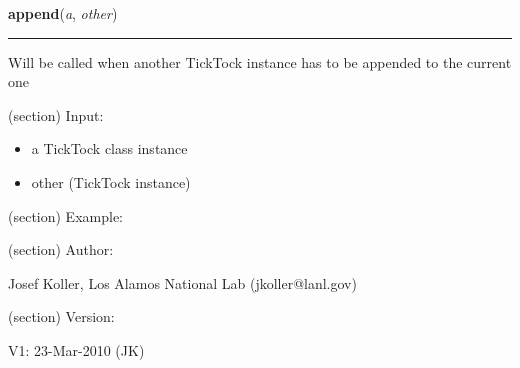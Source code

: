     \label{spacepy:spacetime:TickTock:append}

    \vspace{0.5ex}

\hspace{.8\funcindent}\begin{boxedminipage}{\funcwidth}

    \raggedright \textbf{append}(\textit{a}, \textit{other})

    \vspace{-1.5ex}

    \rule{\textwidth}{0.5\fboxrule}
\setlength{\parskip}{2ex}
    Will be called when another TickTock instance has to be appended to the
    current one

    (section) Input:

      \begin{itemize}
      \setlength{\parskip}{0.6ex}
        \item a TickTock class instance

        \item other (TickTock instance)

      \end{itemize}

    (section) Example:

    (section) Author:

      Josef Koller, Los Alamos National Lab (jkoller@lanl.gov)

    (section) Version:

      V1: 23-Mar-2010 (JK)

\setlength{\parskip}{1ex}
    \end{boxedminipage}

    \label{spacepy:spacetime:TickTock:getCDF}

    \vspace{0.5ex}

